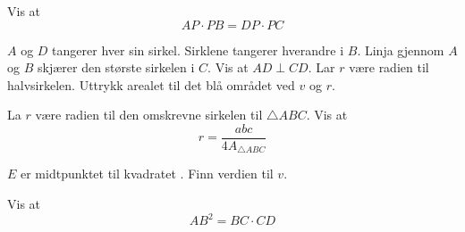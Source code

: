 \newpage
{}
Vis at 
\[ AP\cdot PB = DP\cdot PC \]

$ A $ og $ D $ tangerer hver sin sirkel. Sirklene tangerer hverandre i $ B $. Linja gjennom $ A $ og $ B $ skjærer den største sirkelen i $ C $. Vis at $ AD\perp CD $.
\newpage
{}
Lar $ r $ være radien til halvsirkelen. Uttrykk arealet til det blå området ved $ v $ og $ r $.








La $ r $ være radien til den omskrevne sirkelen til $ \triangle ABC $. Vis at
\[ r=\frac{abc}{4A_{\triangle ABC}} \]







$ E $ er midtpunktet til kvadratet . Finn verdien til $ v $.

\newpage
{}
Vis at
\[ AB^2 = BC\cdot CD \]






